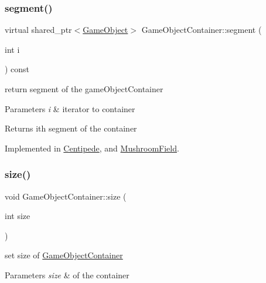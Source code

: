 \subsubsection{\texorpdfstring{segment()}{segment()}}
{\footnotesize\ttfamily virtual shared\+\_\+ptr$<$\mbox{\hyperlink{class_game_object}{Game\+Object}}$>$ Game\+Object\+Container\+::segment (\begin{DoxyParamCaption}\item[{int}]{i }\end{DoxyParamCaption}) const\hspace{0.3cm}{\ttfamily [pure virtual]}}



return segment of the game\+Object\+Container 


\begin{DoxyParams}{Parameters}
{\em i} & iterator to container \\
\hline
\end{DoxyParams}
\begin{DoxyReturn}{Returns}
ith segment of the container 
\end{DoxyReturn}


Implemented in \mbox{\hyperlink{class_centipede_ae722488780d0d19e63510647b5fe108c}{Centipede}}, and \mbox{\hyperlink{class_mushroom_field_a478cc3df9deaf0e7a0b48fd2d128eeb8}{Mushroom\+Field}}.

\mbox{\label{class_game_object_container_a4502e18e58c774b681e7ef8e6319910d}} 
\subsubsection{\texorpdfstring{size()}{size()}\hspace{0.1cm}{\footnotesize\ttfamily [1/2]}}
{\footnotesize\ttfamily void Game\+Object\+Container\+::size (\begin{DoxyParamCaption}\item[{int}]{size }\end{DoxyParamCaption})\hspace{0.3cm}{\ttfamily [inline]}}



set size of \mbox{\hyperlink{class_game_object_container}{Game\+Object\+Container}} 


\begin{DoxyParams}{Parameters}
{\em size} & of the container \\
\hline
\end{DoxyParams}
\mbox{\label{class_game_object_container_afda69d0805c2ee12dd2b972fd66b34c9}} 
